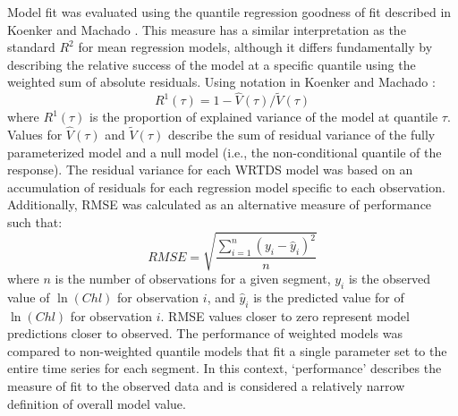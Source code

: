 \documentclass{svjour3}\usepackage[]{graphicx}\usepackage[]{color}
\begin{document}
Model fit was evaluated using the quantile regression goodness of fit described in Koenker and Machado \cite{Koenker99}.  This measure has a similar interpretation as the standard $R^2$ for mean regression models, although it differs fundamentally by describing the relative success of the model at a specific quantile using the weighted sum of absolute residuals. Using notation in Koenker and Machado \cite{Koenker99}:
\begin{equation}
R^1\left(\tau\right) = 1 - \hat{V}\left(\tau\right)/\tilde{V}\left(\tau\right)
\end{equation}
\noindent where $R^1\left(\tau\right)$ is the proportion of explained variance of the model at quantile $\tau$.  Values for $\hat{V}\left(\tau\right)$ and $\tilde{V}\left(\tau\right)$ describe the sum of residual variance of the fully parameterized model and a null model (i.e., the non-conditional quantile of the response).  The residual variance for each \ac{WRTDS} model was based on an accumulation of residuals for each regression model specific to each observation.  Additionally, \ac{RMSE} was calculated as an alternative measure of performance such that:
\begin{equation}
RMSE = \sqrt {{\frac{{\sum\limits_{{i = 1}}^n {{{\left( {{y_i} - {{\hat{y}}_i}} \right)}^2}} }}{{n}}}}
\end{equation}
\noindent where $n$ is the number of observations for a given segment, $y_i$ is the observed value of $\ln\left(Chl\right)$ for observation $i$, and ${\hat{y}}_i$ is the predicted value for of $\ln\left(Chl\right)$ for observation $i$.  \ac{RMSE} values closer to zero represent model predictions closer to observed. The performance of weighted models was compared to non-weighted quantile models that fit a single parameter set to the entire time series for each segment.  In this context, `performance' describes the measure of fit to the observed data and is considered a relatively narrow definition of overall model value.  
\end{document}
